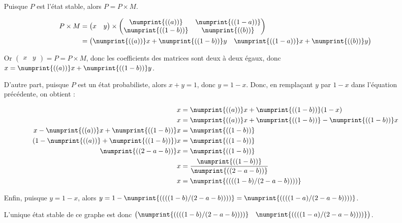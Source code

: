 \exercice*
Puisque $P$ est l'état stable, alors $P=P\times M$.

\begin{align*}
    P\times M &= \begin{pmatrix}x&y\end{pmatrix}\times
\begin{pmatrix}
  \numprint{(( a ))} & \numprint{(( 1-a ))} \\
  \numprint{(( 1-b ))} & \numprint{(( b ))} \\
\end{pmatrix}\\
&= \begin{pmatrix}
  \numprint{(( a ))} x + \numprint{(( 1-b ))} y & \numprint{(( 1-a ))} x + \numprint{(( b ))} y
\end{pmatrix}
\end{align*}

Or $\begin{pmatrix}x&y\end{pmatrix}=P=P\times M$, donc les coefficients des matrices sont deux à deux égaux, donc $x=\numprint{(( a ))} x + \numprint{(( 1-b ))} y$.

D'autre part, puisque $P$ est un état probabiliste, alors $x+y=1$, donc $y=1-x$. Donc, en remplaçant $y$ par $1-x$ dans l'équation précédente, on obtient :

\begin{align*}
  x &= \numprint{(( a ))} x + \numprint{(( 1-b ))} (1-x) \\
  x &= \numprint{(( a ))} x + \numprint{(( 1-b ))} - \numprint{(( 1-b ))}x\\
  x-\numprint{(( a ))} x +\numprint{(( 1-b ))}x &= \numprint{(( 1-b ))}\\
  (1-\numprint{(( a ))}+\numprint{(( 1-b ))})x &= \numprint{(( 1-b ))}\\
  \numprint{(( 2-a-b ))} x &= \numprint{(( 1-b ))}\\
  x &= \frac{\numprint{(( 1-b ))}}{\numprint{(( 2-a-b ))}}\\
x &= \numprint{(( ((1-b)/(2-a-b)) ))}
\end{align*}

Enfin, puisque $y=1-x$, alors $y=1-\numprint{(( ((1-b)/(2-a-b)) ))}=\numprint{(( ((1-a)/(2-a-b)) ))}$.

L'unique état stable de ce graphe est donc $\begin{pmatrix}
\numprint{(( ((1-b)/(2-a-b)) ))} &
\numprint{(( ((1-a)/(2-a-b)) ))}
\end{pmatrix}$.
